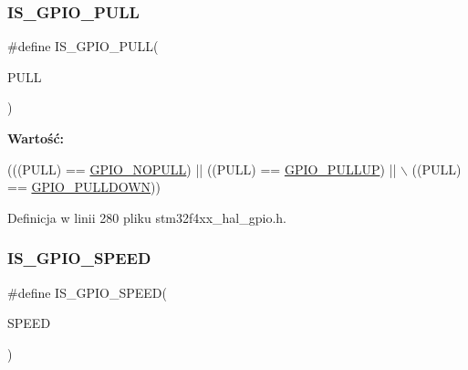 \mbox{\label{group___g_p_i_o___private___macros_ga1cb9706d23fb79584aae41e5e503f3cd}} 
\subsubsection{\texorpdfstring{I\+S\+\_\+\+G\+P\+I\+O\+\_\+\+P\+U\+LL}{IS\_GPIO\_PULL}}
{\footnotesize\ttfamily \#define I\+S\+\_\+\+G\+P\+I\+O\+\_\+\+P\+U\+LL(\begin{DoxyParamCaption}\item[{}]{P\+U\+LL }\end{DoxyParamCaption})}

{\bfseries Wartość\+:}
\begin{DoxyCode}
(((PULL) == \hyperlink{group___g_p_i_o__pull__define_ga5c2862579882c1cc64e36d38fbd07a4c}{GPIO\_NOPULL}) || ((PULL) == \hyperlink{group___g_p_i_o__pull__define_gae689bc8f5c42d6df7bd54a8dd372e072}{GPIO\_PULLUP}) || \(\backslash\)
                            ((PULL) == \hyperlink{group___g_p_i_o__pull__define_ga75d958d0410c36da7f27d1f4f5c36c14}{GPIO\_PULLDOWN}))
\end{DoxyCode}


Definicja w linii 280 pliku stm32f4xx\+\_\+hal\+\_\+gpio.\+h.

\mbox{\label{group___g_p_i_o___private___macros_ga888e1f951df2fe9dbf827528051a3a56}} 
\subsubsection{\texorpdfstring{I\+S\+\_\+\+G\+P\+I\+O\+\_\+\+S\+P\+E\+ED}{IS\_GPIO\_SPEED}}
{\footnotesize\ttfamily \#define I\+S\+\_\+\+G\+P\+I\+O\+\_\+\+S\+P\+E\+ED(\begin{DoxyParamCaption}\item[{}]{S\+P\+E\+ED }\end{DoxyParamCaption})}

